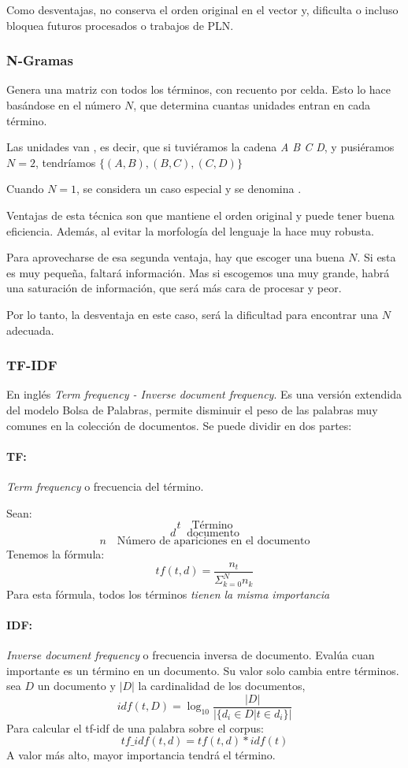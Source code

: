 \documentclass{report}
\begin{document}
Como desventajas, no conserva el orden original en el vector y, dificulta o incluso bloquea futuros procesados o trabajos de PLN.

\subsubsection{N-Gramas}
Genera una matriz con todos los términos, con recuento por celda.
Esto lo hace basándose en el número $N$, que determina cuantas unidades entran en cada término. 

Las unidades van , es decir, que si tuviéramos la cadena \textit{A B C D}, y pusiéramos $N=2$, tendríamos $\{(A,B),(B,C),(C,D)\}$

Cuando $N=1$, se considera un caso especial y se denomina .

Ventajas de esta técnica son que mantiene el orden original y puede tener buena eficiencia. Además, al evitar la morfología del lenguaje la hace muy robusta.

Para aprovecharse de esa segunda ventaja, hay que escoger una buena $N$.
Si esta es muy pequeña, faltará información. Mas si escogemos una muy grande, habrá una saturación de información, que será más cara de procesar y peor.

Por lo tanto, la desventaja en este caso, será la dificultad para encontrar una $N$ adecuada.

\subsubsection{TF-IDF}
En inglés \textit{Term frequency - Inverse document frequency}.
Es una versión extendida del modelo Bolsa de Palabras, permite disminuir el peso de las palabras muy comunes en la colección de documentos.
Se puede dividir en dos partes:
\paragraph{TF:} 
\textit{Term frequency} o frecuencia del término.

Sean:
\[t\quad\text{Término}\]
\[d\quad\text{documento}\]
\[n\quad\text{Número de apariciones en el documento}\]
Tenemos la fórmula:
\[tf(t,d)=\frac{n_t}{\Sigma_{k=0}^{N} n_k}\]
Para esta fórmula, todos los términos \textit{tienen la misma importancia}

\paragraph{IDF:}
\textit{Inverse document frequency} o frecuencia inversa de documento.
Evalúa cuan importante es un término en un documento.
Su valor solo cambia entre términos.
sea $D$ un documento y $|D|$ la cardinalidad de los documentos,
\[idf(t,D)=\log_{10}\frac{|D|}{| \{d_i \in D | t \in d_i\}|}\]
Para calcular el tf-idf de una palabra sobre el corpus:
\[tf\_idf(t,d)=tf(t,d)*idf(t)\]
A valor más alto, mayor importancia tendrá el término.
\end{document}
